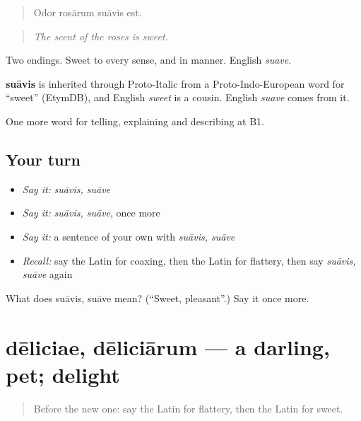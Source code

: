 \begin{quote}
Odor rosārum suāvis est.
\end{quote}

\begin{quote}
\emph{The scent of the roses is sweet.}
\end{quote}

Two endings. Sweet to every sense, and in manner. English \emph{suave}.

\begin{cousinweb}
\textbf{suāvis} is inherited through Proto-Italic from a Proto-Indo-European word for \textquotedblleft{}sweet\textquotedblright{} (EtymDB), and English \emph{sweet} is a cousin. English \emph{suave} comes from it.
\end{cousinweb}

\begin{grammarlens}[title={What you've built}]
One more word for telling, explaining and describing at B1.
\end{grammarlens}

\subsection*{Your turn}
\begin{itemize}
\raggedright
  \item \emph{Say it:} \emph{suāvis, suāve}
  \item \emph{Say it:} \emph{suāvis, suāve}, once more
  \item \emph{Say it:} a sentence of your own with \emph{suāvis, suāve}
  \item \emph{Recall:} say the Latin for coaxing, then the Latin for flattery, then say \emph{suāvis, suāve} again
\end{itemize}

\begin{tcolorbox}[breakable,colback=teal!4,colframe=teal!35!black,title={Before you move on}]
What does suāvis, suāve mean? (\textquotedblleft{}Sweet, pleasant\textquotedblright{}.) Say it once more.
\end{tcolorbox}
\section[dēliciae, dēliciārum]{dēliciae, dēliciārum — a darling, pet; delight}

\label{lesson:LA-C536-deliciae}



\begin{quote}
Before the new one: say the Latin for flattery, then the Latin for sweet.
\end{quote}


